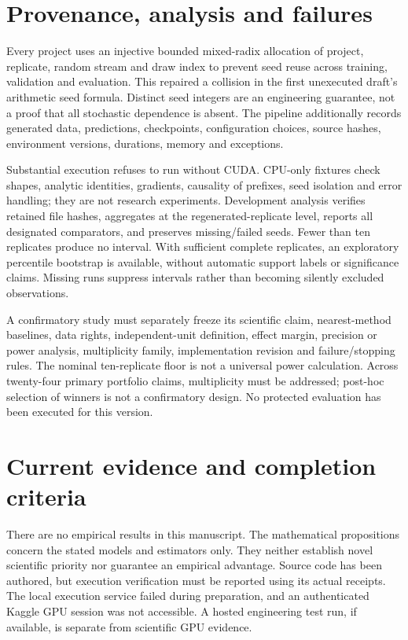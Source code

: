 \documentclass[10pt]{article}
\begin{document}
\section{Provenance, analysis and failures}
Every project uses an injective bounded mixed-radix allocation of project, replicate, random stream and draw index to prevent seed reuse across training, validation and evaluation. This repaired a collision in the first unexecuted draft's arithmetic seed formula. Distinct seed integers are an engineering guarantee, not a proof that all stochastic dependence is absent. The pipeline additionally records generated data, predictions, checkpoints, configuration choices, source hashes, environment versions, durations, memory and exceptions.

Substantial execution refuses to run without CUDA. CPU-only fixtures check shapes, analytic identities, gradients, causality of prefixes, seed isolation and error handling; they are not research experiments. Development analysis verifies retained file hashes, aggregates at the regenerated-replicate level, reports all designated comparators, and preserves missing/failed seeds. Fewer than ten replicates produce no interval. With sufficient complete replicates, an exploratory percentile bootstrap is available, without automatic support labels or significance claims. Missing runs suppress intervals rather than becoming silently excluded observations.

A confirmatory study must separately freeze its scientific claim, nearest-method baselines, data rights, independent-unit definition, effect margin, precision or power analysis, multiplicity family, implementation revision and failure/stopping rules. The nominal ten-replicate floor is not a universal power calculation. Across twenty-four primary portfolio claims, multiplicity must be addressed; post-hoc selection of winners is not a confirmatory design. No protected evaluation has been executed for this version.

\section{Current evidence and completion criteria}
There are no empirical results in this manuscript. The mathematical propositions concern the stated models and estimators only. They neither establish novel scientific priority nor guarantee an empirical advantage. Source code has been authored, but execution verification must be reported using its actual receipts. The local execution service failed during preparation, and an authenticated Kaggle GPU session was not accessible. A hosted engineering test run, if available, is separate from scientific GPU evidence.
\end{document}
